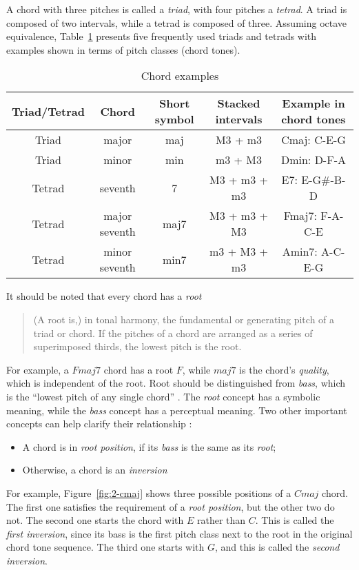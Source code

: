 A chord with three pitches is called a {\it triad}, with four pitches a {\it tetrad}. A triad is composed of two intervals, while a tetrad is composed of three. Assuming octave equivalence, Table~\ref{tab:2-chords} presents five frequently used triads and tetrads with examples shown in terms of pitch classes (chord tones).
\begin{table}[htb]
\caption{Chord examples}
\centering
\scriptsize
\begin{tabular}{|c|c|c|c|c|} \hline
Triad/Tetrad & Chord & Short symbol & Stacked intervals & Example in chord tones \\ \hline
Triad & major & maj & M3 + m3 & Cmaj: C-E-G \\ \hline
Triad & minor & min & m3 + M3 & Dmin: D-F-A \\ \hline
Tetrad  & seventh & 7 & M3 + m3 + m3 & E7: E-G\#-B-D \\ \hline
Tetrad & major seventh & maj7 & M3 + m3 + M3 & Fmaj7: F-A-C-E \\ \hline
Tetrad & minor seventh & min7 & m3 + M3 + m3 & Amin7: A-C-E-G \\ \hline
\end{tabular}
\label{tab:2-chords}
\end{table}
It should be noted that every chord has a {\it root} \cite{randel1999harvard}
\begin{quote}
(A root is,) in tonal harmony, the fundamental or generating pitch of a triad or chord. If the pitches of a chord are arranged as a series of superimposed thirds, the lowest pitch is the root.
\end{quote}
For example, a $Fmaj7$ chord has a root $F$, while $maj7$ is the chord's {\it quality}, which is independent of the root. Root should be distinguished from {\it bass}, which is the ``lowest pitch of any single chord'' \cite{randel1999harvard}. The {\it root} concept has a symbolic meaning, while the {\it bass} concept has a perceptual meaning. Two other important concepts can help clarify their relationship \cite{randel1999harvard}:
\begin{itemize}
\item A chord is in {\it root position}, if its {\it bass} is the same as its {\it root};
\item Otherwise, a chord is an {\it inversion}
\end{itemize}
For example, Figure~\ref{fig:2-cmaj} shows three possible positions of a $Cmaj$ chord. The first one satisfies the requirement of a {\it root position}, but the other two do not. The second one starts the chord with $E$ rather than $C$. This is called the {\it first inversion}, since its bass is the first pitch class next to the root in the original chord tone sequence. The third one starts with $G$, and this is called the {\it second inversion}.
